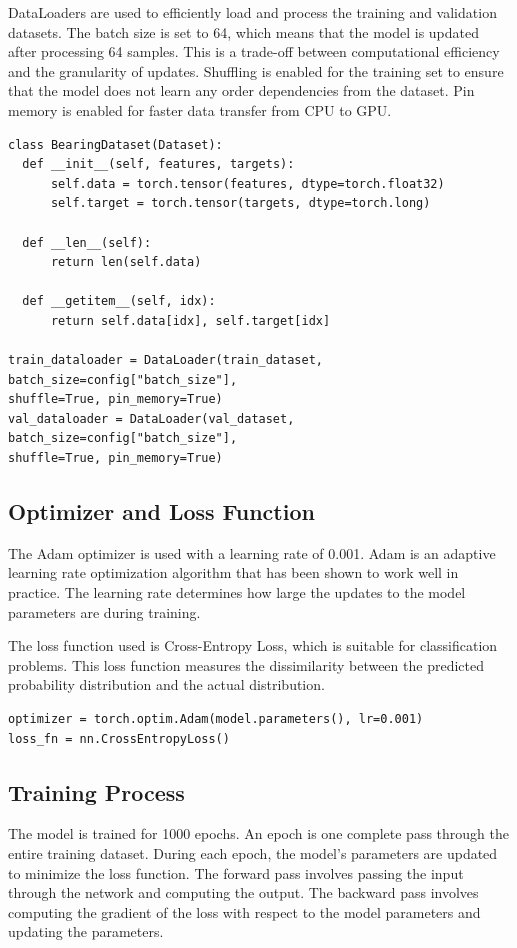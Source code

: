DataLoaders are used to efficiently load and process the training and validation datasets. The batch size is set to 64, which means that the model is updated after processing 64 samples. This is a trade-off between computational efficiency and the granularity of updates. Shuffling is enabled for the training set to ensure that the model does not learn any order dependencies from the dataset. Pin memory is enabled for faster data transfer from CPU to GPU.

\begin{verbatim}
class BearingDataset(Dataset):
  def __init__(self, features, targets):
      self.data = torch.tensor(features, dtype=torch.float32)
      self.target = torch.tensor(targets, dtype=torch.long)

  def __len__(self):
      return len(self.data)

  def __getitem__(self, idx):
      return self.data[idx], self.target[idx]

train_dataloader = DataLoader(train_dataset, batch_size=config["batch_size"],
shuffle=True, pin_memory=True)
val_dataloader = DataLoader(val_dataset, batch_size=config["batch_size"],
shuffle=True, pin_memory=True)
\end{verbatim}

\subsection*{Optimizer and Loss Function}

The Adam optimizer is used with a learning rate of 0.001. Adam is an adaptive learning rate optimization algorithm that has been shown to work well in practice. The learning rate determines how large the updates to the model parameters are during training.

The loss function used is Cross-Entropy Loss, which is suitable for classification problems. This loss function measures the dissimilarity between the predicted probability distribution and the actual distribution.

\begin{verbatim}
optimizer = torch.optim.Adam(model.parameters(), lr=0.001)
loss_fn = nn.CrossEntropyLoss()
\end{verbatim}

\subsection*{Training Process}

The model is trained for 1000 epochs. An epoch is one complete pass through the entire training dataset. During each epoch, the model's parameters are updated to minimize the loss function. The forward pass involves passing the input through the network and computing the output. The backward pass involves computing the gradient of the loss with respect to the model parameters and updating the parameters.

